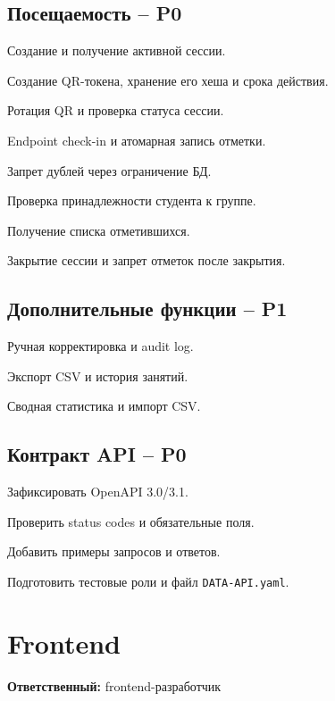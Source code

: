 \documentclass[11pt,a4paper]{article}
\newcommand{\PZero}{\textcolor{PZero}{\textbf{P0}}}
\newcommand{\POne}{\textcolor{POne}{\textbf{P1}}}
\newcommand{\owner}[1]{\textcolor{Muted}{\textbf{Ответственный:} #1}}
\newcommand{\code}[1]{\texttt{#1}}
\begin{document}
\subsection{Посещаемость -- \PZero}
\begin{tasklist}
  \item Создание и получение активной сессии.
  \item Создание QR-токена, хранение его хеша и срока действия.
  \item Ротация QR и проверка статуса сессии.
  \item Endpoint check-in и атомарная запись отметки.
  \item Запрет дублей через ограничение БД.
  \item Проверка принадлежности студента к группе.
  \item Получение списка отметившихся.
  \item Закрытие сессии и запрет отметок после закрытия.
\end{tasklist}

\subsection{Дополнительные функции -- \POne}
\begin{tasklist}
  \item Ручная корректировка и audit log.
  \item Экспорт CSV и история занятий.
  \item Сводная статистика и импорт CSV.
\end{tasklist}

\subsection{Контракт API -- \PZero}
\begin{tasklist}
  \item Зафиксировать OpenAPI 3.0/3.1.
  \item Проверить status codes и обязательные поля.
  \item Добавить примеры запросов и ответов.
  \item Подготовить тестовые роли и файл \code{DATA-API.yaml}.
\end{tasklist}

\section{Frontend}
\owner{frontend-разработчик}
\end{document}
